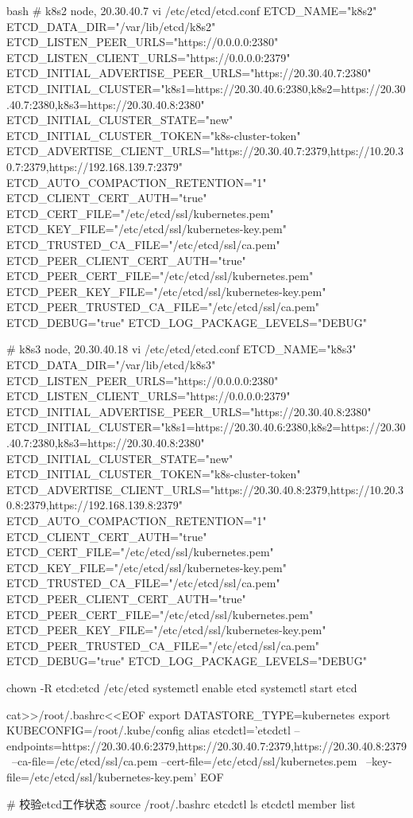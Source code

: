 \begin{outline}[enumerate]
\begin{code-block}{bash}
# k8s2 node, 20.30.40.7
vi /etc/etcd/etcd.conf
ETCD_NAME="k8s2"
ETCD_DATA_DIR="/var/lib/etcd/k8s2"
ETCD_LISTEN_PEER_URLS="https://0.0.0.0:2380"
ETCD_LISTEN_CLIENT_URLS="https://0.0.0.0:2379"
ETCD_INITIAL_ADVERTISE_PEER_URLS="https://20.30.40.7:2380"
ETCD_INITIAL_CLUSTER="k8s1=https://20.30.40.6:2380,k8s2=https://20.30.40.7:2380,k8s3=https://20.30.40.8:2380"
ETCD_INITIAL_CLUSTER_STATE="new"
ETCD_INITIAL_CLUSTER_TOKEN="k8s-cluster-token"
ETCD_ADVERTISE_CLIENT_URLS="https://20.30.40.7:2379,https://10.20.30.7:2379,https://192.168.139.7:2379"
ETCD_AUTO_COMPACTION_RETENTION="1"
ETCD_CLIENT_CERT_AUTH="true"
ETCD_CERT_FILE="/etc/etcd/ssl/kubernetes.pem"
ETCD_KEY_FILE="/etc/etcd/ssl/kubernetes-key.pem"
ETCD_TRUSTED_CA_FILE="/etc/etcd/ssl/ca.pem"
ETCD_PEER_CLIENT_CERT_AUTH="true"
ETCD_PEER_CERT_FILE="/etc/etcd/ssl/kubernetes.pem"
ETCD_PEER_KEY_FILE="/etc/etcd/ssl/kubernetes-key.pem"
ETCD_PEER_TRUSTED_CA_FILE="/etc/etcd/ssl/ca.pem"
ETCD_DEBUG="true"
ETCD_LOG_PACKAGE_LEVELS="DEBUG"

# k8s3 node, 20.30.40.18
vi /etc/etcd/etcd.conf
ETCD_NAME="k8s3"
ETCD_DATA_DIR="/var/lib/etcd/k8s3"
ETCD_LISTEN_PEER_URLS="https://0.0.0.0:2380"
ETCD_LISTEN_CLIENT_URLS="https://0.0.0.0:2379"
ETCD_INITIAL_ADVERTISE_PEER_URLS="https://20.30.40.8:2380"
ETCD_INITIAL_CLUSTER="k8s1=https://20.30.40.6:2380,k8s2=https://20.30.40.7:2380,k8s3=https://20.30.40.8:2380"
ETCD_INITIAL_CLUSTER_STATE="new"
ETCD_INITIAL_CLUSTER_TOKEN="k8s-cluster-token"
ETCD_ADVERTISE_CLIENT_URLS="https://20.30.40.8:2379,https://10.20.30.8:2379,https://192.168.139.8:2379"
ETCD_AUTO_COMPACTION_RETENTION="1"
ETCD_CLIENT_CERT_AUTH="true"
ETCD_CERT_FILE="/etc/etcd/ssl/kubernetes.pem"
ETCD_KEY_FILE="/etc/etcd/ssl/kubernetes-key.pem"
ETCD_TRUSTED_CA_FILE="/etc/etcd/ssl/ca.pem"
ETCD_PEER_CLIENT_CERT_AUTH="true"
ETCD_PEER_CERT_FILE="/etc/etcd/ssl/kubernetes.pem"
ETCD_PEER_KEY_FILE="/etc/etcd/ssl/kubernetes-key.pem"
ETCD_PEER_TRUSTED_CA_FILE="/etc/etcd/ssl/ca.pem"
ETCD_DEBUG="true"
ETCD_LOG_PACKAGE_LEVELS="DEBUG"

chown -R etcd:etcd /etc/etcd
systemctl enable etcd
systemctl start etcd

cat>>/root/.bashrc<<EOF
export DATASTORE_TYPE=kubernetes
export KUBECONFIG=/root/.kube/config
alias etcdctl='etcdctl --endpoints=https://20.30.40.6:2379,https://20.30.40.7:2379,https://20.30.40.8:2379 \
    --ca-file=/etc/etcd/ssl/ca.pem --cert-file=/etc/etcd/ssl/kubernetes.pem  \
    --key-file=/etc/etcd/ssl/kubernetes-key.pem'
EOF

# 校验etcd工作状态
source /root/.bashrc
etcdctl ls
etcdctl member list
\end{code-block}


\end{outline}
